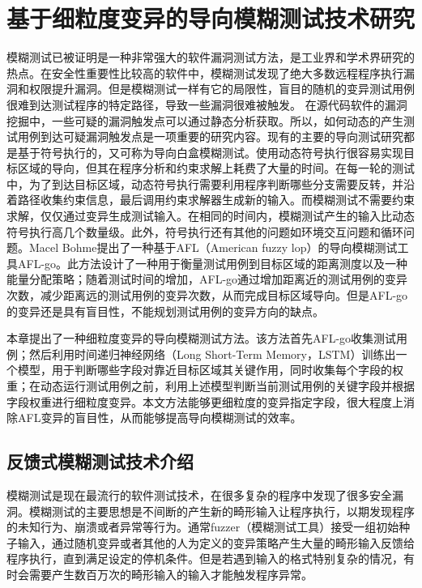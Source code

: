 \chapter{基于细粒度变异的导向模糊测试技术研究}

模糊测试已被证明是一种非常强大的软件漏洞测试方法，是工业界和学术界研究的热点。在安全性重要性比较高的软件中，模糊测试发现了绝大多数远程程序执行漏洞和权限提升漏洞。但是模糊测试一样有它的局限性，盲目的随机的变异测试用例很难到达测试程序的特定路径，导致一些漏洞很难被触发。
在源代码软件的漏洞挖掘中，一些可疑的漏洞触发点可以通过静态分析获取。所以，如何动态的产生测试用例到达可疑漏洞触发点是一项重要的研究内容。现有的主要的导向测试研究都是基于符号执行的，又可称为导向白盒模糊测试。使用动态符号执行很容易实现目标区域的导向，但其在程序分析和约束求解上耗费了大量的时间。在每一轮的测试中，为了到达目标区域，动态符号执行需要利用程序判断哪些分支需要反转，并沿着路径收集约束信息，最后调用约束求解器生成新的输入。而模糊测试不需要约束求解，仅仅通过变异生成测试输入。在相同的时间内，模糊测试产生的输入比动态符号执行高几个数量级。此外，符号执行还有其他的问题如环境交互问题和循环问题。Macel Bohme提出了一种基于AFL（American fuzzy lop）的导向模糊测试工具AFL-go。此方法设计了一种用于衡量测试用例到目标区域的距离测度以及一种能量分配策略；随着测试时间的增加，AFL-go通过增加距离近的测试用例的变异次数，减少距离远的测试用例的变异次数，从而完成目标区域导向。但是AFL-go的变异还是具有盲目性，不能规划测试用例的变异方向的缺点。

本章提出了一种细粒度变异的导向模糊测试方法。该方法首先AFL-go收集测试用例；然后利用时间递归神经网络（Long Short-Term Memory，LSTM）训练出一个模型，用于判断哪些字段对靠近目标区域其关键作用，同时收集每个字段的权重；在动态运行测试用例之前，利用上述模型判断当前测试用例的关键字段并根据字段权重进行细粒度变异。本文方法能够更细粒度的变异指定字段，很大程度上消除AFL变异的盲目性，从而能够提高导向模糊测试的效率。


\section{反馈式模糊测试技术介绍}\label{模糊测试介绍}

模糊测试是现在最流行的软件测试技术，在很多复杂的程序中发现了很多安全漏洞。模糊测试的主要思想是不间断的产生新的畸形输入让程序执行，以期发现程序的未知行为、崩溃或者异常等行为。通常fuzzer（模糊测试工具）接受一组初始种子输入，通过随机变异或者其他的人为定义的变异策略产生大量的畸形输入反馈给程序执行，直到满足设定的停机条件。但是若遇到输入的格式特别复杂的情况，有时会需要产生数百万次的畸形输入的输入才能触发程序异常。

